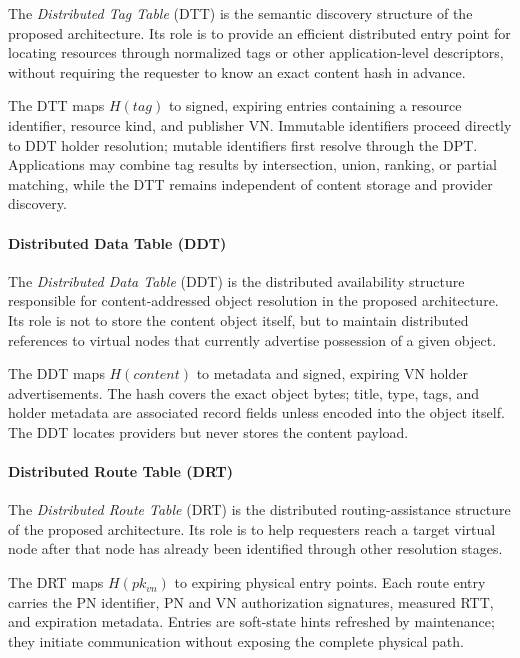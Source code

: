 \documentclass[12pt]{article}
\begin{document}
The \textit{Distributed Tag Table} (DTT) is the semantic discovery structure of the proposed architecture. Its role is to provide an efficient distributed entry point for locating resources through normalized tags or other application-level descriptors, without requiring the requester to know an exact content hash in advance.

The DTT maps $H(tag)$ to signed, expiring entries containing a resource identifier, resource kind, and publisher VN. Immutable identifiers proceed directly to DDT holder resolution; mutable identifiers first resolve through the DPT. Applications may combine tag results by intersection, union, ranking, or partial matching, while the DTT remains independent of content storage and provider discovery.

\paragraph{Distributed Data Table (DDT)}

The \textit{Distributed Data Table} (DDT) is the distributed availability structure responsible for content-addressed object resolution in the proposed architecture. Its role is not to store the content object itself, but to maintain distributed references to virtual nodes that currently advertise possession of a given object.

The DDT maps $H(content)$ to metadata and signed, expiring VN holder advertisements. The hash covers the exact object bytes; title, type, tags, and holder metadata are associated record fields unless encoded into the object itself. The DDT locates providers but never stores the content payload.

\paragraph{Distributed Route Table (DRT)}

The \textit{Distributed Route Table} (DRT) is the distributed routing-assistance structure of the proposed architecture. Its role is to help requesters reach a target virtual node after that node has already been identified through other resolution stages.

The DRT maps $H(pk_{vn})$ to expiring physical entry points. Each route entry carries the PN identifier, PN and VN authorization signatures, measured RTT, and expiration metadata. Entries are soft-state hints refreshed by maintenance; they initiate communication without exposing the complete physical path.
\end{document}
